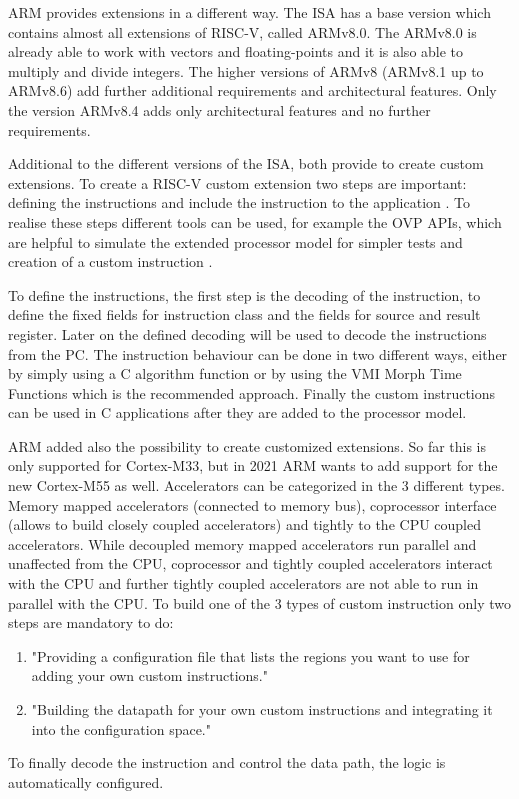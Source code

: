 \documentclass[conference]{IEEEtran}
\begin{document}
ARM provides extensions in a different way. The \gls{ISA} has a base version which contains almost all extensions of RISC-V, called ARMv8.0. The ARMv8.0 is already able to work with vectors and floating-points and it is also able to multiply and divide integers. The higher versions of ARMv8 (ARMv8.1 up to ARMv8.6) add further additional requirements and architectural features. Only the version ARMv8.4 adds only architectural features and no further requirements. \cite{Arm2020}

Additional to the different versions of the \gls{ISA}, both provide to create custom extensions.
To create a RISC-V custom extension two steps are important: defining the instructions and include the instruction to the application \cite{Limited2019}. To realise these steps different tools can be used, for example the OVP APIs, which are helpful to simulate the extended processor model for simpler tests and creation of a custom instruction \cite{Imperas}.

To define the instructions, the first step is the decoding of the instruction, to define the fixed fields for instruction class and the fields for source and result register. Later on the defined decoding will be used to decode the instructions from the PC. The instruction behaviour can be done in two different ways, either by simply using a C algorithm function or by using the VMI Morph Time Functions which is the recommended approach. Finally the custom instructions can be used in C applications after they are added to the processor model. \cite{Limited2019}

ARM added also the possibility to create customized extensions. So far this is only supported for Cortex-M33, but in 2021 ARM wants to add support for the new Cortex-M55 as well. Accelerators can be categorized in the 3 different types. Memory mapped accelerators (connected to memory bus), coprocessor interface (allows to build closely coupled accelerators) and tightly to the CPU coupled accelerators. 
While decoupled memory mapped accelerators run parallel and unaffected from the CPU, coprocessor and tightly coupled accelerators interact with the CPU and further tightly coupled accelerators are not able to run in parallel with the CPU. To build one of the 3 types of custom instruction only two steps are mandatory to do: 
\begin{enumerate}
\item "Providing a configuration file that lists the regions you want to use for adding your own custom instructions." \cite[page 4]{LauranneChoquin2020}
\item "Building the datapath for your own custom instructions and integrating
it into the configuration space." \cite[page 4]{LauranneChoquin2020}
\end{enumerate}
To finally decode the instruction and control the data path, the logic is automatically configured. \cite{LauranneChoquin2020}
\end{document}

